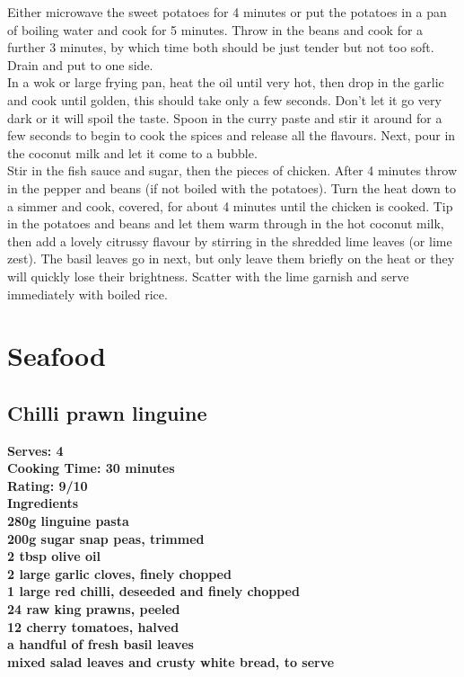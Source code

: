\documentclass[18pt, oneside]{book}
\begin{document}
Either microwave the sweet potatoes for 4 minutes or put the potatoes in a pan of boiling water and cook for 5 minutes. Throw in the beans and cook for a further 3 minutes, by which time both should be just tender but not too soft. Drain and put to one side. \\

In a wok or large frying pan, heat the oil until very hot, then drop in the garlic and cook until golden, this should take only a few seconds. Don’t let it go very dark or it will spoil the taste. Spoon in the curry paste and stir it around for a few seconds to begin to cook the spices and release all the flavours. Next, pour in the coconut milk and let it come to a bubble. \\

Stir in the fish sauce and sugar, then the pieces of chicken. After 4 minutes throw in the pepper and beans (if not boiled with the potatoes). Turn the heat down to a simmer and cook, covered, for about 4 minutes until the chicken is cooked. Tip in the potatoes and beans and let them warm through in the hot coconut milk, then add a lovely citrussy flavour by stirring in the shredded lime leaves (or lime zest). The basil leaves go in next, but only leave them briefly on the heat or they will quickly lose their brightness. Scatter with the lime garnish and serve immediately with boiled rice.

\chapter{Seafood}

\section{Chilli prawn linguine}

\bf{Serves: 4} \\
\bf{Cooking Time: 30 minutes} \\
\bf{Rating: 9/10} \\

\bf{Ingredients} \normalfont \\

280g linguine pasta \\
200g sugar snap peas, trimmed \\
2 tbsp olive oil \\
2 large garlic cloves, finely chopped \\
1 large red chilli, deseeded and finely chopped \\
24 raw king prawns, peeled \\
12 cherry tomatoes, halved \\
a handful of fresh basil leaves \\
mixed salad leaves and crusty white bread, to serve \\
\end{document}
